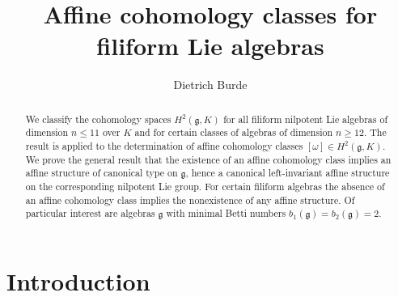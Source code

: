 \documentclass[12pt]{amsart}
\theoremstyle{definition}
\theoremstyle{remark}
\newcommand{\Lg}{\mathfrak{g}}
\newcommand{\om}{\omega}
\begin{document}

\title[Affine cohomology classes]{Affine cohomology classes for filiform Lie algebras} 

\author[D. Burde]{Dietrich Burde}
\address{Mathematisches Institut\\
  Heinrich-Heine-Universit\"at\\
  Universit\"atsstr. 1\\
  40225 D\"us\-sel\-dorf\\
  Germany}


\begin{abstract}

We classify the cohomology spaces $H^2(\Lg,K)$ for all
filiform nilpotent Lie algebras of dimension $n\le 11$ over $K$
and for certain classes of algebras of dimension $n\ge 12$.
The result is applied to the determination of
affine cohomology classes $[\om]\in H^2(\Lg,K)$.
We prove the general result that the
existence of an affine cohomology class implies an affine
structure of canonical type on $\Lg$, 
hence a canonical left-invariant affine structure
on the corresponding nilpotent Lie group.
For certain filiform algebras the absence of an affine
cohomology class implies the nonexistence of any affine
structure. Of particular interest are algebras $\Lg$
with minimal Betti numbers $b_1(\Lg)=b_2(\Lg)=2$.
\end{abstract}

\maketitle

\section{Introduction}
\end{document}
